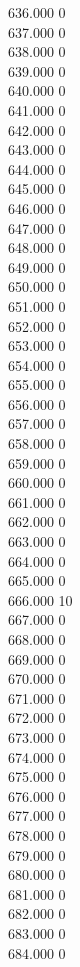 { 636.000	0 \\
 637.000	0 \\
 638.000	0 \\
 639.000	0 \\
 640.000	0 \\
 641.000	0 \\
 642.000	0 \\
 643.000	0 \\
 644.000	0 \\
 645.000	0 \\
 646.000	0 \\
 647.000	0 \\
 648.000	0 \\
 649.000	0 \\
 650.000	0 \\
 651.000	0 \\
 652.000	0 \\
 653.000	0 \\
 654.000	0 \\
 655.000	0 \\
 656.000	0 \\
 657.000	0 \\
 658.000	0 \\
 659.000	0 \\
 660.000	0 \\
 661.000	0 \\
 662.000	0 \\
 663.000	0 \\
 664.000	0 \\
 665.000	0 \\
 666.000	10 \\
 667.000	0 \\
 668.000	0 \\
 669.000	0 \\
 670.000	0 \\
 671.000	0 \\
 672.000	0 \\
 673.000	0 \\
 674.000	0 \\
 675.000	0 \\
 676.000	0 \\
 677.000	0 \\
 678.000	0 \\
 679.000	0 \\
 680.000	0 \\
 681.000	0 \\
 682.000	0 \\
 683.000	0 \\
 684.000	0 \\
}
